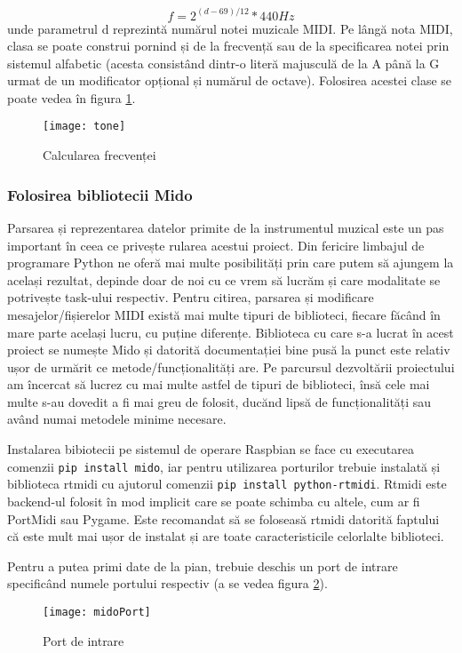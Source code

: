 \documentclass[../IoMusT.tex]{subfiles}
\begin{document}
\[ f = 2^{(d-69)/12} * 440Hz\]
unde parametrul d reprezintă numărul notei muzicale MIDI. Pe lângă nota MIDI, clasa se poate construi pornind și de la frecvență sau de la specificarea notei prin sistemul alfabetic (acesta consistând dintr-o literă majusculă de la A până la G urmat de un modificator opțional și numărul de octave). Folosirea acestei clase se poate vedea în figura \ref{fig:tone}.
\begin{figure}[h]
\centering
\texttt{[image: tone]}
\caption{Calcularea frecvenței}
\label{fig:tone}
\end{figure}

\subsubsection{Folosirea bibliotecii Mido}
Parsarea și reprezentarea datelor primite de la instrumentul muzical este un pas important în ceea ce privește rularea acestui proiect. Din fericire limbajul de programare Python ne oferă mai multe posibilități prin care putem să ajungem la același rezultat, depinde doar de noi cu ce vrem să lucrăm și care modalitate se potrivește task-ului respectiv. Pentru citirea, parsarea și modificare mesajelor/fișierelor MIDI există mai multe tipuri de biblioteci, fiecare făcând în mare parte același lucru, cu puține diferențe. Biblioteca cu care s-a lucrat în acest proiect se numește Mido și datorită documentației bine pusă la punct este relativ ușor de urmărit ce metode/funcționalități are. Pe parcursul dezvoltării proiectului am încercat să lucrez cu mai multe astfel de tipuri de biblioteci, însă cele mai multe s-au dovedit a fi mai greu de folosit, ducănd lipsă de funcționalități sau având numai metodele minime necesare.
\\
\par Instalarea bibiotecii pe sistemul de operare Raspbian se face cu executarea comenzii \verb|pip install mido|, iar pentru utilizarea porturilor trebuie instalată și biblioteca rtmidi cu ajutorul comenzii \verb|pip install python-rtmidi|. Rtmidi este backend-ul folosit în mod implicit care se poate schimba cu altele, cum ar fi PortMidi sau Pygame. Este recomandat să se foloseasă rtmidi datorită faptului că este mult mai ușor de instalat și are toate caracteristicile celorlalte biblioteci. 
\\
\par Pentru a putea primi date de la pian, trebuie deschis un port de intrare specificând numele portului respectiv (a se vedea figura \ref{fig:port}).
\begin{figure}[h]
\centering
\texttt{[image: midoPort]}
\caption{Port de intrare}
\label{fig:port}
\end{figure}
\end{document}
